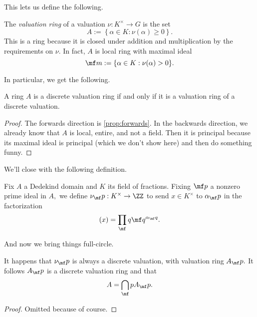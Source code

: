\documentclass[../notes.tex]{subfiles}
\begin{document}
This lets us define the following.
\begin{definition}
    The \textit{valuation ring} of a valuation $\nu:K^\times\to G$ is the set
    \[A:=\left\{\alpha\in K:\nu(\alpha)\ge0\right\}.\]
    This is a ring because it is closed under addition and multiplication by the requirements on $\nu.$ In fact, $A$ is local ring with maximal ideal
    \[\mf m:=\{\alpha\in K:\nu(\alpha)>0\}.\]
\end{definition}
In particular, we get the following.
\begin{proposition}
    A ring $A$ is a discrete valuation ring if and only if it is a valuation ring of a discrete valuation.
\end{proposition}
\begin{proof}
    The forwards direction is \autoref{prop:forwards}. In the backwards direction, we already know that $A$ is local, entire, and not a field. Then it is principal because its maximal ideal is principal (which we don't show here) and then do something funny.
\end{proof}
We'll close with the following definition.
\begin{definition}
    Fix $A$ a Dedekind domain and $K$ its field of fractions. Fixing $\mf p$ a nonzero prime ideal in $A,$ we define $\nu_\mf p:K^\times\to\ZZ$ to send $x\in K^\times$ to $\alpha_\mf p$ in the factorization
    \[(x)=\prod_\mf q\mf q^{\alpha_\mf q}.\]
\end{definition}
And now we bring things full-circle.
\begin{prop}
    It happens that $\nu_\mf p$ is always a discrete valuation, with valuation ring $A_\mf p.$ It follows $A_\mf p$ is a discrete valuation ring and that
    \[A=\bigcap_\mf pA_\mf p.\]
\end{prop}
\begin{proof}
    Omitted because of course.
\end{proof}
\end{document}
